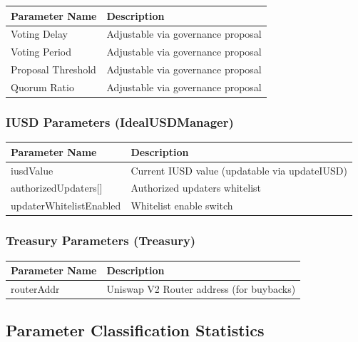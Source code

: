 \documentclass{article}
\begin{document}
\begin{center}
\begin{longtable}{p{4.5cm}p{9.5cm}}
\toprule
Parameter Name & Description \\
\midrule
\endhead
Voting Delay & Adjustable via governance proposal \\
Voting Period & Adjustable via governance proposal \\
Proposal Threshold & Adjustable via governance proposal \\
Quorum Ratio & Adjustable via governance proposal \\
\bottomrule
\end{longtable}
\end{center}

\subsubsection{IUSD Parameters (IdealUSDManager)}

\begin{center}
\begin{longtable}{p{5cm}p{9cm}}
\toprule
Parameter Name & Description \\
\midrule
\endhead
iusdValue & Current IUSD value (updatable via updateIUSD) \\
authorizedUpdaters[] & Authorized updaters whitelist \\
updaterWhitelistEnabled & Whitelist enable switch \\
\bottomrule
\end{longtable}
\end{center}

\subsubsection{Treasury Parameters (Treasury)}

\begin{center}
\begin{longtable}{p{4cm}p{10cm}}
\toprule
Parameter Name & Description \\
\midrule
\endhead
routerAddr & Uniswap V2 Router address (for buybacks) \\
\bottomrule
\end{longtable}
\end{center}

\subsection{Parameter Classification Statistics}
\end{document}
